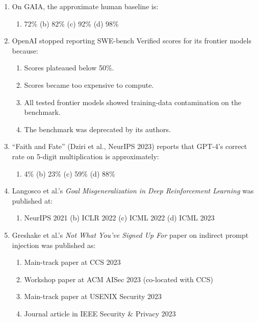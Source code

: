 \documentclass[11pt,a4paper]{article}
\begin{document}
\begin{enumerate}[label=Q\arabic*.]
\item On GAIA, the approximate human baseline is:
\begin{enumerate}[label=(\alph*)]
  \item 72\% \qquad (b) 82\% \qquad (c) 92\% \qquad (d) 98\%
\end{enumerate}

\item OpenAI stopped reporting SWE-bench Verified scores for its
      frontier models because:
\begin{enumerate}[label=(\alph*)]
  \item Scores plateaued below 50\%.
  \item Scores became too expensive to compute.
  \item All tested frontier models showed training-data contamination
        on the benchmark.
  \item The benchmark was deprecated by its authors.
\end{enumerate}

\item ``Faith and Fate'' (Dziri et al., NeurIPS 2023) reports that
      GPT-4's correct rate on 5-digit multiplication is approximately:
\begin{enumerate}[label=(\alph*)]
  \item 4\% \qquad (b) 23\% \qquad (c) 59\% \qquad (d) 88\%
\end{enumerate}

\item Langosco et al.'s \emph{Goal Misgeneralization in Deep
      Reinforcement Learning} was published at:
\begin{enumerate}[label=(\alph*)]
  \item NeurIPS 2021 \qquad (b) ICLR 2022 \qquad (c) ICML 2022 \qquad (d) ICML 2023
\end{enumerate}

\item Greshake et al.'s \emph{Not What You've Signed Up For} paper on
      indirect prompt injection was published as:
\begin{enumerate}[label=(\alph*)]
  \item Main-track paper at CCS 2023
  \item Workshop paper at ACM AISec 2023 (co-located with CCS)
  \item Main-track paper at USENIX Security 2023
  \item Journal article in IEEE Security \& Privacy 2023
\end{enumerate}


\end{enumerate}
\end{document}
